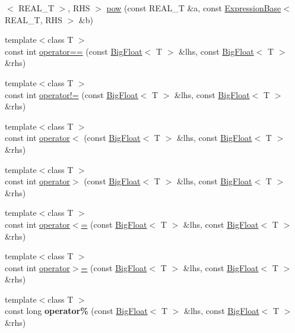 \begin{DoxyCompactItemize}
$<$ R\+E\+A\+L\+\_\+\+T $>$, R\+H\+S $>$ \hyperlink{namespaceatl_ac127fb6528badb9739e2f060a59903e5}{pow} (const R\+E\+A\+L\+\_\+\+T \&a, const \hyperlink{structatl_1_1_expression_base}{Expression\+Base}$<$ R\+E\+A\+L\+\_\+\+T, R\+H\+S $>$ \&b)
\item 
{\footnotesize template$<$class T $>$ }\\const int \hyperlink{namespaceatl_a18435258d4fd2e5a0dfd31620ab4e071}{operator==} (const \hyperlink{classatl_1_1_big_float}{Big\+Float}$<$ T $>$ \&lhs, const \hyperlink{classatl_1_1_big_float}{Big\+Float}$<$ T $>$ \&rhs)
\item 
{\footnotesize template$<$class T $>$ }\\const int \hyperlink{namespaceatl_a69933d4e5f16aa201f3abcd223d79d04}{operator!=} (const \hyperlink{classatl_1_1_big_float}{Big\+Float}$<$ T $>$ \&lhs, const \hyperlink{classatl_1_1_big_float}{Big\+Float}$<$ T $>$ \&rhs)
\item 
{\footnotesize template$<$class T $>$ }\\const int \hyperlink{namespaceatl_ac10029698cc6292ffff02df554ee7dcc}{operator$<$} (const \hyperlink{classatl_1_1_big_float}{Big\+Float}$<$ T $>$ \&lhs, const \hyperlink{classatl_1_1_big_float}{Big\+Float}$<$ T $>$ \&rhs)
\item 
{\footnotesize template$<$class T $>$ }\\const int \hyperlink{namespaceatl_a26086860f12407db3042c3289e6b1187}{operator$>$} (const \hyperlink{classatl_1_1_big_float}{Big\+Float}$<$ T $>$ \&lhs, const \hyperlink{classatl_1_1_big_float}{Big\+Float}$<$ T $>$ \&rhs)
\item 
{\footnotesize template$<$class T $>$ }\\const int \hyperlink{namespaceatl_ac765ed3b46e917613a106223f087e872}{operator$<$=} (const \hyperlink{classatl_1_1_big_float}{Big\+Float}$<$ T $>$ \&lhs, const \hyperlink{classatl_1_1_big_float}{Big\+Float}$<$ T $>$ \&rhs)
\item 
{\footnotesize template$<$class T $>$ }\\const int \hyperlink{namespaceatl_ace57d4f665a6c1e8161739aa113791a4}{operator$>$=} (const \hyperlink{classatl_1_1_big_float}{Big\+Float}$<$ T $>$ \&lhs, const \hyperlink{classatl_1_1_big_float}{Big\+Float}$<$ T $>$ \&rhs)
\item 
\hypertarget{namespaceatl_adb529a5253f4aab9fbf96c26b5588e74}{{\footnotesize template$<$class T $>$ }\\const long {\bfseries operator\%} (const \hyperlink{classatl_1_1_big_float}{Big\+Float}$<$ T $>$ \&lhs, const \hyperlink{classatl_1_1_big_float}{Big\+Float}$<$ T $>$ \&rhs)}\label{namespaceatl_adb529a5253f4aab9fbf96c26b5588e74}


\end{DoxyCompactItemize}
